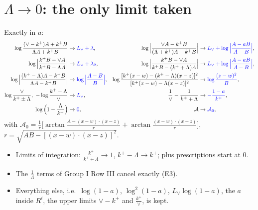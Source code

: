 \documentclass[10pt]{article}
\numberwithin{equation}{section}
\newcommand{\new}[1]{{\color{blue}#1}}
\newcommand{\Lv}{L_{\vee}}
\begin{document}
\section{\texorpdfstring{$\Lambda\to0$}{Lambda -> 0}: the only limit taken}\label{sec:lam}
Exactly in $a$:
\begin{align*}
\log\frac{(\vee-k^+)A+k^+B}{\Lambda A+k^+B}&\to\new{\Lv+\lambda}, &
\log\Big|\frac{\vee A-k^+B}{(\Lambda+k^+)A-k^+B}\Big|&\to\new{\Lv+\log\Big|\frac{A-aB}{A-B}\Big|},\\
\log\Big|\frac{k^+B-\vee A}{k^+B-\Lambda A}\Big|&\to\new{\Lv+\lambda_2}, &
\log\Big|\frac{k^+B-\vee A}{k^+B-(k^++\Lambda)A}\Big|&\to\new{\Lv+\log\Big|\frac{A-aB}{A-B}\Big|},\\
\log\Big|\frac{(k^+-\Lambda)A-k^+B}{\Lambda A-k^+B}\Big|&\to\new{\log\Big|\frac{A-B}{B}\Big|}, &
\log\frac{[k^+(x-w)-(k^+-\Lambda)(x-z)]^2}{[k^+(x-w)-\Lambda(x-z)]^2}&\to\new{\log\frac{(z-w)^2}{B}},\\
\log\frac{\vee}{k^+\pm\Lambda},\ -\log\frac{k^+-\Lambda}{\vee}&\to\new{\Lv}, &
\frac1\vee-\frac{1}{k^++\Lambda}&\to\new{-\frac{1-a}{k^+}},\\
\log\Big(1-\frac{\Lambda}{k^+}\Big)&\to\new{0}, & \mathcal A&\to\new{\mathcal A_0},
\end{align*}
with $\mathcal A_0=\frac1r\big[\arctan\frac{A-(x-w)\cdot(x-z)}{r}+\arctan\frac{(x-w)\cdot(x-z)}{r}\big]$, $r=\sqrt{AB-[(x-w)\cdot(x-z)]^2}$.
\begin{itemize}
\item Limits of integration: $\frac{k^+}{k^++\Lambda}\to1$, $k^+-\Lambda\to k^+$; plus prescriptions start at $0$.
\item The $\frac{1}{\Lambda}$ terms of Group I Row III cancel exactly (E3).
\item Everything else, i.e.\ $\log(1-a)$, $\log^2(1-a)$, $\Lv\log(1-a)$, the $a$ inside $R^i$, the upper limits $\vee-k^+$ and $\frac{k^+}{\vee}$, is kept.
\end{itemize}

\end{document}
